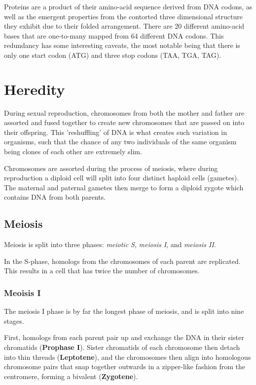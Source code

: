 Proteins are a product of their \gls{amino-acid} sequence derived from DNA codons, as well as the emergent properties from the contorted three dimensional structure they exhibit due to their folded arrangement.  There are 20 different \gls{amino-acid} bases that are one-to-many mapped from 64 different DNA codons. This redundancy has some interesting caveats, the most notable being that there is only one start codon (ATG) and three stop codons (TAA, TGA, TAG).

\section{Heredity}

During sexual reproduction, chromosomes from both the mother and father are assorted and fused together to create new chromosomes that are passed on into their offspring. This 'reshuffling' of DNA is what creates such variation in organisms, such that the chance of any two individuals of the same organism being clones of each other are extremely slim.

Chromosomes are assorted during the process of \gls{meiosis}, where during reproduction a diploid cell will split into four distinct haploid cells (gametes). The maternal and paternal gametes then merge to form a diploid \gls{zygote} which contains DNA from both parents.


\subsection{Meiosis}

Meiosis is split into three phases: \textit{meiotic S}, \textit{meiosis I}, and \textit{meiosis II}. 

In the S-phase, homologs from the chromosomes of each parent are replicated. This results in a cell that has twice the number of chromosomes.

\subsubsection{Meoisis I}

The meiosis I phase is by far the longest phase of meiosis, and is split into nine stages. 

First, homologs from each parent pair up and exchange the DNA in their sister chromatids (\textbf{Prophase I}).  Sister chromatids of each chromosome then detach into thin threads (\textbf{Leptotene}), and the chromosomes then align into homologous chromosome pairs that snap together outwards in a zipper-like fashion from the centromere, forming a \gls{bivalent} (\textbf{Zygotene}). 

